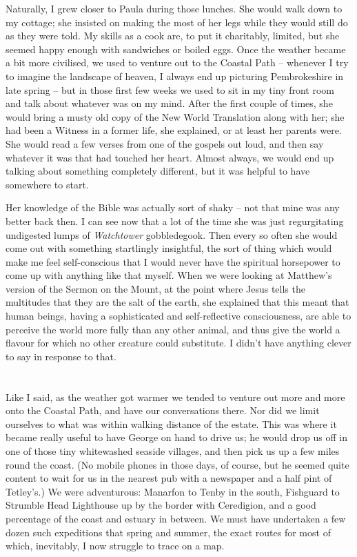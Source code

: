 Naturally, I grew closer to Paula during those lunches. She would walk down to my cottage; she insisted on making the most of her legs while they would still do as they were told. My skills as a cook are, to put it charitably, limited, but she seemed happy enough with sandwiches or boiled eggs. Once the weather became a bit more civilised, we used to venture out to the Coastal Path -- whenever I try to imagine the landscape of heaven, I always end up picturing Pembrokeshire in late spring -- but in those first few weeks we used to sit in my tiny front room and talk about whatever was on my mind. After the first couple of times, she would bring a musty old copy of the New World Translation along with her; she had been a Witness in a former life, she explained, or at least her parents were. She would read a few verses from one of the gospels out loud, and then say whatever it was that had touched her heart. Almost always, we would end up talking about something completely different, but it was helpful to have somewhere to start.

Her knowledge of the Bible was actually sort of shaky -- not that mine was any better back then. I can see now that a lot of the time she was just regurgitating undigested lumps of \textit{Watchtower} gobbledegook. Then every so often she would come out with something startlingly insightful, the sort of thing which would make me feel self-conscious that I would never have the spiritual horsepower to come up with anything like that myself. When we were looking at Matthew's version of the Sermon on the Mount, at the point where Jesus tells the multitudes that they are the salt of the earth, she explained that this meant that human beings, having a sophisticated and self-reflective consciousness, are able to perceive the world more fully than any other animal, and thus give the world a flavour for which no other creature could substitute. I didn't have anything clever to say in response to that.

\section{}

Like I said, as the weather got warmer we tended to venture out more and more onto the Coastal Path, and have our conversations there. Nor did we limit ourselves to what was within walking distance of the estate. This was where it became really useful to have George on hand to drive us; he would drop us off in one of those tiny whitewashed seaside villages, and then pick us up a few miles round the coast. (No mobile phones in those days, of course, but he seemed quite content to wait for us in the nearest pub with a newspaper and a half pint of Tetley's.) We were adventurous: Manarfon to Tenby in the south, Fishguard to Strumble Head Lighthouse up by the border with Ceredigion, and a good percentage of the coast and estuary in between. We must have undertaken a few dozen such expeditions that spring and summer, the exact routes for most of which, inevitably, I now struggle to trace on a map.

